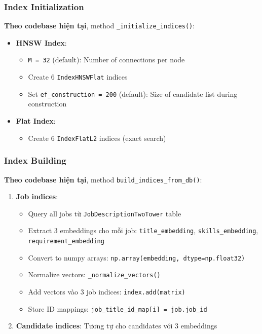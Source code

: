 \subsubsection{Index Initialization}

\textbf{Theo codebase hiện tại}, method \texttt{\_initialize\_indices()}:

\begin{itemize}
    \item \textbf{HNSW Index}:
    \begin{itemize}
        \item \texttt{M = 32} (default): Number of connections per node
        \item Create 6 \texttt{IndexHNSWFlat} indices
        \item Set \texttt{ef\_construction = 200} (default): Size of candidate list during construction
    \end{itemize}
    
    \item \textbf{Flat Index}:
    \begin{itemize}
        \item Create 6 \texttt{IndexFlatL2} indices (exact search)
    \end{itemize}
\end{itemize}

\subsubsection{Index Building}

\textbf{Theo codebase hiện tại}, method \texttt{build\_indices\_from\_db()}:

\begin{enumerate}
    \item \textbf{Job indices}:
    \begin{itemize}
        \item Query all jobs từ \texttt{JobDescriptionTwoTower} table
        \item Extract 3 embeddings cho mỗi job: \texttt{title\_embedding}, \texttt{skills\_embedding}, \texttt{requirement\_embedding}
        \item Convert to numpy arrays: \texttt{np.array(embedding, dtype=np.float32)}
        \item Normalize vectors: \texttt{\_normalize\_vectors()}
        \item Add vectors vào 3 job indices: \texttt{index.add(matrix)}
        \item Store ID mappings: \texttt{job\_title\_id\_map[i] = job.job\_id}
    \end{itemize}
    
    \item \textbf{Candidate indices}: Tương tự cho candidates với 3 embeddings
\end{enumerate}

